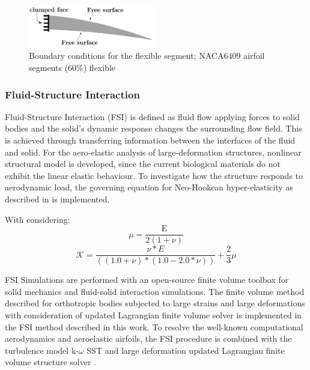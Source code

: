 \begin{figure}[ht!]
\centering
\includegraphics[width=0.5\textwidth]{Figures/naca6409_solid.pdf}
\caption{ Boundary conditions for the flexible segment; NACA6409 airfoil segments (60\%) flexible }
\label{fig:segments}
\end{figure}



\subsubsection{Fluid-Structure Interaction}

Fluid-Structure Interaction (FSI) is defined as fluid flow applying forces to solid bodies and the solid’s dynamic response changes the surrounding flow field. 
%
This is achieved through transferring information between the interfaces of the fluid and solid.
%
For the aero-elastic analysis of large-deformation structures, nonlinear structural model is developed, since the current biological materials do not exhibit the linear elastic behaviour.
%
To investigate how the structure responds to aerodynamic load, the governing equation for Neo-Hookean hyper-elasticity as described in \citet{Wiggins1998ComputationalInelasticity} is implemented.

With considering: 
    \begin{equation}
        \mu= \frac{\mathrm{E}}{2(1+\nu)}
    \end{equation}
    \begin{equation}
        \mathcal{K}= \frac{\nu*E}{((1.0 + \nu)*(1.0 - 2.0*\nu))} + \frac{2}{3}\mu
    \end{equation}

%

FSI Simulations are performed with an open-source finite volume toolbox for solid mechanics and fluid-solid interaction simulations.
%
The finite volume method described for orthotropic bodies subjected to large strains and large deformations with consideration of updated Lagrangian finite volume solver \cite{Tukovic2014} is implemented in the FSI method described in this work.
%
To resolve the well-known computational aerodynamics and aeroelastic airfoils, the FSI procedure is combined with the turbulence model k-$\omega$ SST and large deformation updated Lagrangian finite volume structure solver \cite{Cardiff2018}.

